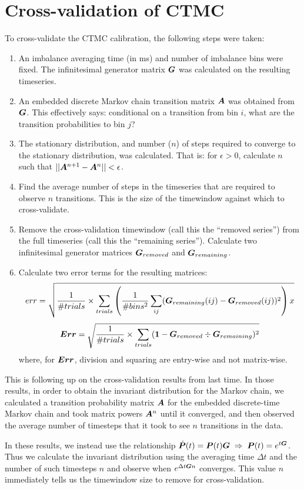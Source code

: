 \section{Cross-validation of CTMC}
To cross-validate the CTMC calibration, the following steps were taken:
\begin{enumerate}
\item An imbalance averaging time (in ms) and number of imbalance bins were fixed. The infinitesimal generator matrix $\boldsymbol{G}$ was calculated on the resulting timeseries. 
\item An embedded discrete Markov chain transition matrix $\boldsymbol{A}$ was obtained from $\boldsymbol{G}$. This effectively says: conditional on a transition from bin $i$, what are the transition probabilities to bin $j$?
\item The stationary distribution, and number ($n$) of steps required to converge to the stationary distribution, was calculated. That is: for $\epsilon > 0$, calculate $n$ such that $||\boldsymbol{A}^{n+1} - \boldsymbol{A}^n|| < \epsilon$.
\item Find the average number of steps in the timeseries that are required to observe $n$ transitions. This is the size of the timewindow against which to cross-validate. 
\item Remove the cross-validation timewindow (call this the ``removed series'') from the full timeseries (call this the ``remaining series''). Calculate two infinitesimal generator matrices $\boldsymbol{G}_{removed}$ and $\boldsymbol{G}_{remaining}$.
\item Calculate two error terms for the resulting matrices:
$$err = \sqrt{\dfrac{1}{\#trials} \times \sum\limits_{trials} \left( \dfrac{1}{\#bins^2} \sum\limits_{ij} (\boldsymbol{G}_{remaining}(ij) - \boldsymbol{G}_{removed}(ij))^2 \right)x} $$
$$\boldsymbol{Err} = \sqrt{\dfrac{1}{\#trials} \times \sum\limits_{trials} (\boldsymbol{1} - \boldsymbol{G}_{removed} \div \boldsymbol{G}_{remaining})^2 }$$
where, for $\boldsymbol{Err}$, division and squaring are entry-wise and not matrix-wise.
\end{enumerate}

This is following up on the cross-validation results from last time. In those results, in order to obtain the invariant distribution for the Markov chain, we calculated a transition probability matrix $\boldsymbol{A}$ for the embedded discrete-time Markov chain and took matrix powers $\boldsymbol{A}^n$ until it converged, and then observed the average number of timesteps that it took to see $n$ transitions in the data.

In these results, we instead use the relationship $\dot{\boldsymbol{P}} (t) = \boldsymbol{P}(t)\boldsymbol{G} \; \Rightarrow \; \boldsymbol{P}(t) = e^{t\boldsymbol{G}}$. Thus we calculate the invariant distribution using the averaging time $\Delta t$ and the number of such timesteps $n$ and observe when $e^{\Delta t\boldsymbol{G}n}$ converges. This value $n$ immediately tells us the timewindow size to remove for cross-validation.


